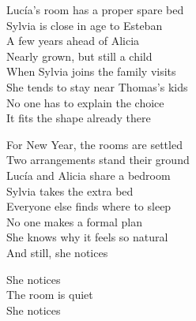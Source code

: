 \begin{lyrics}
Lucía's room has a proper spare bed\\
Sylvia is close in age to Esteban\\
A few years ahead of Alicia\\
Nearly grown, but still a child\\
When Sylvia joins the family visits\\
She tends to stay near Thomas's kids\\
No one has to explain the choice\\
It fits the shape already there

For New Year, the rooms are settled\\
Two arrangements stand their ground\\
Lucía and Alicia share a bedroom\\
Sylvia takes the extra bed\\
Everyone else finds where to sleep\\
No one makes a formal plan\\
She knows why it feels so natural\\
And still, she notices

She notices\\
The room is quiet\\
She notices
\end{lyrics}

